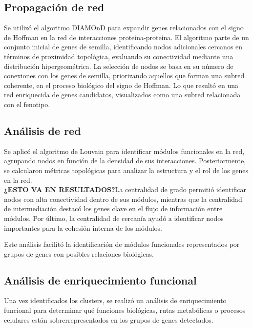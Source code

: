 \subsection{Propagación de red}

Se utilizó el algoritmo DIAMOnD para expandir genes relacionados con el signo de Hoffman en la red de interacciones proteína-proteína. El algoritmo parte de un conjunto inicial de genes de semilla, identificando nodos adicionales cercanos en términos de proximidad topológica, evaluando su conectividad mediante una distribución hipergeométrica. La selección de nodos se basa en su número de conexiones con los genes de semilla, priorizando aquellos que forman una subred coherente, en el proceso biológico del signo de Hoffman. Lo que resultó en una red enriquecida de genes candidatos, visualizados como una subred relacionada con el fenotipo.

\subsection{Análisis de red}
Se aplicó el algoritmo de Louvain para identificar módulos funcionales en la red, agrupando nodos en función de la densidad de sus interacciones. Posteriormente, se calcularon métricas topológicas para analizar la estructura y el rol de los genes en la red. 
\\

\textbf{¿ESTO VA EN RESULTADOS?}La centralidad de grado permitió identificar nodos con alta conectividad dentro de sus módulos, mientras que la centralidad de intermediación destacó los genes clave en el flujo de información entre módulos. Por último, la centralidad de cercanía ayudó a identificar nodos importantes para la cohesión interna de los módulos.

Este análisis facilitó la identificación de módulos funcionales representados por grupos de genes con posibles relaciones biológicas.

\subsection{Análisis de enriquecimiento funcional}

Una vez identificados los clusters, se realizó un análisis de enriquecimiento funcional para determinar qué funciones biológicas, rutas metabólicas o procesos celulares están sobrerrepresentados en los grupos de genes detectados.
